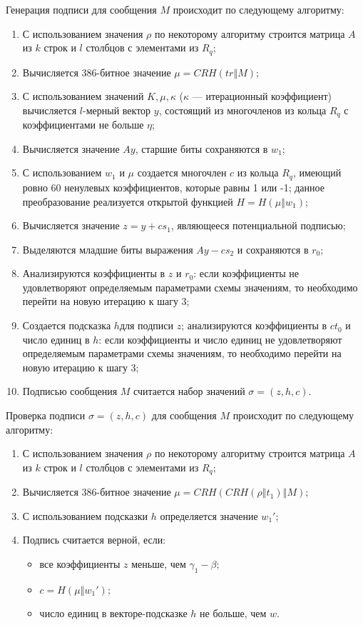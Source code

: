 \documentclass{./civarticle}
\begin{document}
Генерация подписи для сообщения $M$ происходит по следующему алгоритму:

\begin{enumerate}
    \item С использованием значения $\rho$ по некоторому алгоритму строится матрица $A$ из $k$ строк и $l$ столбцов с элементами из $R_q$;
    \item Вычисляется 386-битное значение $\mu = CRH(tr \mathbin\Vert M)$;
    \item С использованием значений $K, \mu, \kappa$  ($\kappa$ --- итерационный коэффициент) вычисляется $l$-мерный вектор $y$, состоящий из многочленов из кольца $R_q$ с коэффициентами не больше $\eta$;
    \item Вычисляется значение $Ay$, старшие биты сохраняются в $w_1$;
    \item С использованием $w_1$ и $\mu$ создается многочлен $c$ из кольца $R_q$, имеющий ровно 60 ненулевых коэффициентов, которые равны 1 или -1; данное преобразование реализуется открытой функцией $H = H(\mu \mathbin\Vert w_1)$;
    \item Вычисляется значение $z = y + cs_1$, являющееся потенциальной подписью;
    \item Выделяются младшие биты выражения $Ay - cs_2$ и сохраняются в $r_0$;
    \item Анализируются коэффициенты в $z$ и $r_0$: если коэффициенты не удовлетворяют определяемым параметрами схемы значениям, то необходимо перейти на новую итерацию к шагу 3;
    \item Создается подсказка $h$для подписи $z$; анализируются коэффициенты в $ct_0$ и число единиц в $h$: если коэффициенты и число единиц не удовлетворяют определяемым параметрами схемы значениям, то необходимо перейти на новую итерацию к шагу 3;
    \item Подписью сообщения $M$ считается набор значений $\sigma = (z, h, c)$.
\end{enumerate}

Проверка подписи $\sigma = (z, h, c)$ для сообщения $M$ происходит по следующему алгоритму:

\begin{enumerate}
    \item С использованием значения $\rho$ по некоторому алгоритму строится матрица $A$ из $k$ строк и $l$ столбцов с элементами из $R_q$;
    \item Вычисляется 386-битное значение $\mu = CRH(CRH(\rho\mathbin\Vert t_1)\mathbin\Vert M)$;
    \item С использованием подсказки $h$ определяется значение $w_1'$;
    \item Подпись считается верной, если:
    \begin{itemize}
        \item все коэффициенты $z$ меньше, чем $\gamma_1 - \beta$;
        \item $c = H(\mu \mathbin\Vert w_1')$;
        \item число единиц в векторе-подсказке $h$ не больше, чем $w$.
    \end{itemize}
\end{enumerate}
\end{document}
